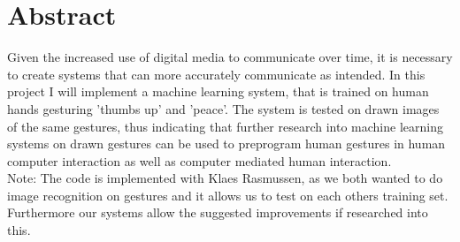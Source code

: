 \documentclass[10pt, a4paper]{article}
\begin{document}
\section{Abstract}
Given the increased use of digital media to communicate over time, it is necessary to create systems that can more accurately communicate as intended. In this project I will implement a machine learning system, that is trained on human hands gesturing 'thumbs up' and 'peace'. The system is tested on drawn images of the same gestures, thus indicating that further research into machine learning systems on drawn gestures can be used to preprogram human gestures in human computer interaction as well as computer mediated human interaction.\\

Note: The code is implemented with Klaes Rasmussen, as we both wanted to do image recognition on gestures and it allows us to test on each others training set. Furthermore our systems allow the suggested improvements if researched into this.



\nocite{*}
\end{document}
